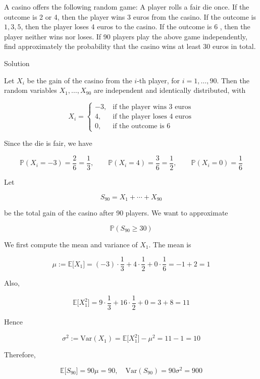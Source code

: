 \documentclass{qlnotes-export}
\begin{document}
A casino offers the following random game: A player rolls a fair die once. If the outcome is 2 or 4, then the player wins 3 euros from the casino. If the outcome is \(1,3,5\), then the player loses 4 euros to the casino. If the outcome is 6 , then the player neither wins nor loses. If 90 players play the above game independently, find approximately the probability that the casino wins at least 30 euros in total.

\begin{qlsolution}{Solution}

Let \(X_{i}\) be the gain of the casino from the \(i\)-th player, for \(i = 1,\ldots,90\). Then the random variables \(X_{1},\ldots,X_{90}\) are independent and identically distributed, with

\[X_{i} = \left\{ \begin{matrix}
{- 3,} & \text{if the player wins 3 euros} \\
{4,} & \text{if the player loses 4 euros} \\
{0,} & \text{if the outcome is 6}
\end{matrix} \right.\]

Since the die is fair, we have

\[{\mathbb{P}}(X_{i} = - 3) = \frac{2}{6} = \frac{1}{3},\qquad{\mathbb{P}}(X_{i} = 4) = \frac{3}{6} = \frac{1}{2},\qquad{\mathbb{P}}(X_{i} = 0) = \frac{1}{6}\]

Let

\[S_{90} = X_{1} + \cdots + X_{90}\]

be the total gain of the casino after 90 players. We want to approximate

\[{\mathbb{P}}(S_{90} \geq 30)\]

We first compute the mean and variance of \(X_{1}\). The mean is

\[\mu := {\mathbb{E}}\lbrack X_{1}\rbrack = ( - 3) \cdot \frac{1}{3} + 4 \cdot \frac{1}{2} + 0 \cdot \frac{1}{6} = - 1 + 2 = 1\]

Also,

\[{\mathbb{E}}\lbrack X_{1}^{2}\rbrack = 9 \cdot \frac{1}{3} + 16 \cdot \frac{1}{2} + 0 = 3 + 8 = 11\]

Hence

\[\sigma^{2} := \text{Var}(X_{1}) = {\mathbb{E}}\lbrack X_{1}^{2}\rbrack - \mu^{2} = 11 - 1 = 10\]

Therefore,

\[{\mathbb{E}}\lbrack S_{90}\rbrack = 90\mu = 90,\quad\text{Var}(S_{90}) = 90\sigma^{2} = 900\]


\end{qlsolution}
\end{document}
